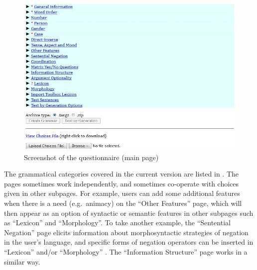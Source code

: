 \begin{figure}[!t]
\begin{center} 
\includegraphics[width=.9\textwidth]{screenshot/ss1.jpg}
\caption{Screenshot of the questionnaire (main page)}
\label{screenshot:main}
\end{center}
\end{figure}



The grammatical categories covered in the current version are listed
in .  The pages sometimes work
independently, and sometimes co-operate with choices given in other
subpages.  For example, users can add some additional features when
there is a need (e.g.\ animacy) on the ``Other Features'' page, which
will then appear as an option of syntactic or semantic features in
other subpages such as ``Lexicon'' and ``Morphology''.  To take
another example, the ``Sentential Negation'' page elicits information
about morphosyntactic strategies of negation in the user's language,
and specific forms of negation operators can be inserted in
``Lexicon'' and/or ``Morphology'' \citep{crowgey:12}. The
``Information Structure'' page works in a similar way.

